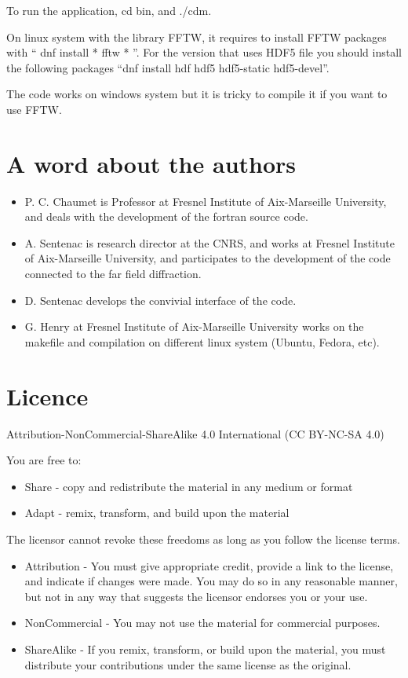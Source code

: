 To run the application, cd bin, and ./cdm.


On linux system with the library FFTW, it requires to install FFTW
packages with `` dnf install * fftw * ''. For the version that uses
HDF5 file you should install the following packages ``dnf install hdf
hdf5 hdf5-static hdf5-devel''.

The code works on windows system but it is tricky to compile it if you
want to use FFTW.



\section{A word about the authors}

\begin{itemize}
\item P. C. Chaumet is Professor at Fresnel Institute of Aix-Marseille
  University, and deals with the development of the fortran source
  code.
\item A. Sentenac is research director at the CNRS, and works at
  Fresnel Institute of Aix-Marseille University, and participates to
  the development of the code connected to the far field diffraction.
\item D. Sentenac develops the convivial interface of the code.
\item G. Henry at Fresnel Institute of Aix-Marseille University works
  on the makefile and compilation on different linux system (Ubuntu,
  Fedora, etc).
\end{itemize}

\section{Licence}


Attribution-NonCommercial-ShareAlike 4.0 International (CC BY-NC-SA 4.0)

You are free to:

\begin{itemize}
\item Share - copy and redistribute the material in any medium or
  format
\item Adapt - remix, transform, and build upon the material
\end{itemize}

The licensor cannot revoke these freedoms as long as you follow the
license terms.
\begin{itemize}
\item Attribution - You must give appropriate credit, provide a link
  to the license, and indicate if changes were made. You may do so in
  any reasonable manner, but not in any way that suggests the licensor
  endorses you or your use.
\item NonCommercial - You may not use the material for commercial
  purposes.
\item ShareAlike - If you remix, transform, or build upon the
  material, you must distribute your contributions under the same
  license as the original.
\end{itemize}


